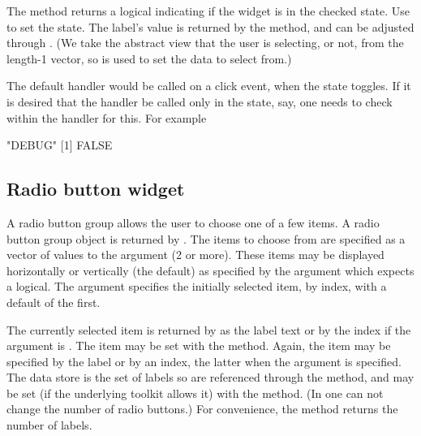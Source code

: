 The  method returns a logical indicating if
the widget is in the checked state. Use  to set
the state. The label's value is returned by the
\method{[}{gcheckbox} method, and can be adjusted through 
\method{[\ASSIGN}{gcheckbox}. (We take the abstract view that the user
is selecting, or not, from the length-1 vector, so \meth{[} is used to
set the data to select from.)

The default handler would be called on a click event, when the state toggles. If it is desired
that the handler be called only in the  state, say, one
needs to check within the handler for this. For example

\begin{Schunk}
\begin{Soutput}
[1] "DEBUG"
[1] FALSE
\end{Soutput}
\end{Schunk}

\subsection{Radio button widget}
\label{sec:gWidgets-radio-button-widget}

A radio button group allows the user to choose one of a few
items. A radio button group object is returned by
. The items to choose from are specified as a
vector of values to the  argument (2 or more). These items
may be displayed horizontally or vertically (the default) as specified by the
 argument which expects a logical. The
 argument specifies the initially selected
item, by index,
with a default of the first.

The currently selected item is returned by  as
the label text or by the index if the argument  is
. The item may be set with the
 method. Again, the item may be
specified by the label or by an index, the latter when the argument
 is specified. The data store is the set of labels so
are referenced through the \method{[}{gradio} method, and may be set
(if the underlying toolkit allows it) with the
\method{[\ASSIGN}{gradio} method. (In  one can not
change the number of radio buttons.) For convenience, the
 method returns the number of labels.

